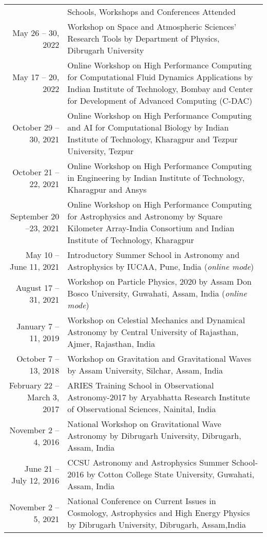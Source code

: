 \documentclass[a4paper, 11pt]{article}
\newcommand{\headingfont}{\Large\color{Bittersweet}}
\newenvironment{SectionTable}[1]{
	\renewcommand*{\arraystretch}{1.7}
	\setlength{\tabcolsep}{10pt}
	\begin{longtable}{Rp{5.2in}} & #1 \\}
{\end{longtable}\vspace{-.3cm}}
\begin{document}
\begin{SectionTable}{\headingfont Schools, Workshops and Conferences Attended}

May 26 -- 30, 2022 &
Workshop on Space and Atmospheric Sciences' Research Tools by Department of Physics, Dibrugarh University
\\

May 17 -- 20, 2022 & 
Online Workshop on High Performance Computing for Computational Fluid Dynamics Applications by Indian Institute of Technology, Bombay and Center for Development of Advanced Computing (C-DAC)
 \\

October 29 -- 30, 2021 & 
Online Workshop on High Performance Computing and AI for Computational Biology by Indian Institute of Technology, Kharagpur and Tezpur University, Tezpur
 \\
October 21 -- 22, 2021 & 
Online Workshop on High Performance Computing in Engineering by Indian Institute of Technology, Kharagpur and Ansys
 \\
 
September 20 --23, 2021 & 
Online Workshop on High Performance Computing for Astrophysics and Astronomy by Square Kilometer Array-India Consortium and Indian Institute of Technology, Kharagpur
 \\

May 10 -- June 11, 2021 &
Introductory Summer School in Astronomy and Astrophysics by IUCAA, Pune, India (\textit{online mode})
\\

August 17 --31, 2021 &
Workshop on Particle Physics, 2020 by Assam Don Bosco University, Guwahati, Assam, India (\textit{online mode})
\\

January 7 --11, 2019 &
Workshop on Celestial Mechanics and Dynamical Astronomy by Central University of Rajasthan, Ajmer, Rajasthan, India
\\

October 7 --13, 2018 &
Workshop on Gravitation and Gravitational Waves by Assam University, Silchar, Assam, India
\\

February 22 -- March 3, 2017 &
ARIES Training School in Observational Astronomy-2017 by Aryabhatta Research Institute of Observational Sciences, Nainital, India
\\

November 2 -- 4, 2016 &
National Workshop on Gravitational Wave Astronomy by Dibrugarh University, Dibrugarh, Assam, India
\\

June 21 -- July 12, 2016 &
CCSU Astronomy and Astrophysics Summer School-2016 by Cotton College State University, Guwahati, Assam, India
\\

November 2 -- 5, 2021 &
National Conference on Current Issues in Cosmology, Astrophysics and High Energy Physics by Dibrugarh University, Dibrugarh, Assam,India
\\
\end{SectionTable}
\end{document}
